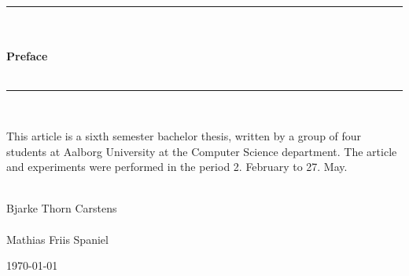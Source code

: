\begin{center}

\rule{\textwidth}{3pt}\\
\hrulefill\\
{ \huge \bfseries Preface} \\
\hrulefill\\
\rule{\textwidth}{3pt}\\
\end{center}

This article is a sixth semester bachelor thesis, written by a group of four students at Aalborg University at the Computer Science department. The article and experiments were performed in the period 2. February to 27. May.  

\begin{center}
\begin{minipage}{6cm}
\makebox[5cm]{}
\makebox[5cm]{}
\makebox[5cm]{\hrulefill}\\
Bjarke Thorn Carstens\\
\makebox[5cm]{}
\makebox[5cm]{}
\makebox[5cm]{\hrulefill}\\
Mathias Friis Spaniel \\
\end{minipage}
\end{center}
\vfill
{\large \today}
